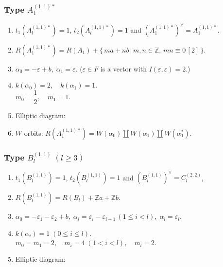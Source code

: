 \documentclass[11pt]{amsart}
\newcommand{\Z}{\mathbb{Z}}
\newcommand{\vep}{\varepsilon}
\begin{document}
{\subsubsection{Type $A_1^{(1,1)\ast}$}
\begin{enumerate}
\item $t_1(A_l^{(1,1)\ast})=1$, \; $t_2(A_l^{(1,1)\ast})=1$ and 
$(A_1^{(1,1)\ast})^\vee=A_1^{(1,1)\ast}$.
\item $R(A_1^{(1,1)\ast})=R(A_1)+\{\, ma+nb\,\vert\, m,n \in \Z, \, mn \equiv 0\, [2]\, \}$.
\item $\alpha_0=-\vep+b, \; \alpha_1=\vep$.  \quad   ($\vep \in F$ is a vector with $I(\vep,\vep)=2$.)
\item $k(\alpha_0)=2, \quad k(\alpha_1)=1$. \\
         $m_0=\dfrac{1}{2}, \quad m_1=1$.
\item Elliptic diagram:

\begin{center}
\end{center}
\item $W$-orbits: $R(A_1^{(1,1)\ast})=W(\alpha_0) \amalg W(\alpha_1) \amalg W(\alpha_1^\ast)$.
\end{enumerate}

\subsubsection{Type $B_l^{(1,1)}\; (l\geq 3)$}
\begin{enumerate}
\item $t_1(B_l^{(1,1)})=1$, \;  $t_2(B_l^{(1,1)})=1$ and  
$(B_l^{(1,1)})^\vee=C_l^{(2,2)}$,
\item $R(B_l^{(1,1)})=R(B_l)+\Z a+\Z b$. 
\item $\alpha_0=-\vep_1-\vep_2+b, \; \alpha_i=\vep_i-\vep_{i+1}\, (1\leq i< l), \; \alpha_l=\vep_l$.
\item $k(\alpha_i)=1 \; (0\leq i\leq l).$ \\
         $m_0=m_1=2,  \quad m_i=4\; (1< i<l), \quad m_l=2$.
\item Elliptic diagram:


\end{enumerate}}
\end{document}
